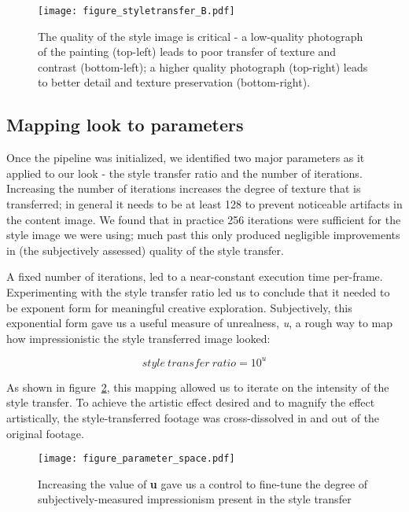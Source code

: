 \documentclass{acmsiggraph}
\begin{document}
\begin{figure}[ht]
  \centering
  \texttt{[image: figure\_styletransfer\_B.pdf]}
  \caption{The quality of the style image is critical - a low-quality photograph of the painting (top-left) leads to poor transfer of texture and contrast (bottom-left); a higher quality photograph (top-right) leads to better detail and texture preservation (bottom-right).}
  \label{fig:styletransfer_B}
\end{figure}

\subsection{Mapping look to parameters}
Once the pipeline was initialized, we identified two major parameters as it applied to our look - the style transfer ratio and the number of iterations. Increasing the number of iterations increases the degree of texture that is transferred; in general it needs to be at least 128 to prevent noticeable artifacts in the content image. We found that in practice 256 iterations were sufficient for the style image we were using; much past this only produced negligible improvements in (the subjectively assessed) quality of the style transfer.

A fixed number of iterations, led to a near-constant execution time per-frame. Experimenting with the style transfer ratio led us to conclude that it needed to be exponent form for meaningful creative exploration. Subjectively, this exponential form gave us a useful measure of unrealness, \textit{u}, a rough way to map how impressionistic the style transferred image looked:

\begin{equation}
style\ transfer\ ratio = 10^u
\end{equation}

As shown in figure~\ref{fig:parameter_space}, this mapping allowed us to iterate on the intensity of the style transfer. To achieve the artistic effect desired and to magnify the effect artistically, the style-transferred footage was cross-dissolved in and out of the original footage.

\begin{figure}[ht]
  \centering
  \texttt{[image: figure\_parameter\_space.pdf]}
  \caption{Increasing the value of \textbf{u} gave us a control to fine-tune the degree of subjectively-measured impressionism present in the style transfer}
  \label{fig:parameter_space}
\end{figure}
\end{document}
